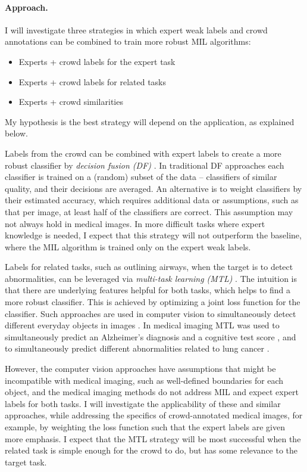 \documentclass[serif, twocolumn, numeric, rga]{jote-article}
\begin{document}
\paragraph{Approach.}

I will investigate three strategies in which expert weak labels and crowd annotations can be combined to train more robust MIL algorithms: 
\begin{itemize}
\item   Experts + crowd labels for the expert task 
\item   Experts + crowd labels for related tasks 
\item   Experts + crowd similarities 
\end{itemize}

My hypothesis is the best strategy will depend on the application, as explained below.

Labels from the crowd can be combined with expert labels to create a more robust classifier by \emph{decision fusion (DF)} \cite{Kittler1998, Kuncheva2004}. In traditional DF approaches each classifier is trained on a (random) subset of the data \cite{Breiman1996a, Ho1998, Dietterich2000} -- classifiers of similar quality, and their decisions are averaged. An alternative is to weight classifiers by their estimated accuracy, which requires additional data or assumptions, such as that per image, at least half of the classifiers are correct.
This assumption may not always hold in medical images. In more difficult tasks where expert knowledge is needed, I expect that this strategy will not outperform the baseline, where the MIL algorithm is trained only on the expert weak labels.

Labels for related tasks, such as outlining airways, when the target is to detect abnormalities, can be leveraged via \emph{multi-task learning (MTL)} \cite{Caruana1998a}. The intuition is that there are underlying features helpful for both tasks, which helps to find a more robust classifier.
This is achieved by optimizing a joint loss function for the classifier.
Such approaches are used in computer vision to simultaneously detect different everyday objects in images \cite{Vezhnevets2010a}. In medical imaging MTL was used to simultaneously predict an Alzheimer's diagnosis and a cognitive test score \cite{Cheng2015}, and to simultaneously predict different abnormalities related to lung cancer \cite{Bi2008a}.

However, the computer vision approaches have assumptions that might be incompatible with medical imaging, such as well-defined boundaries for each object, and the medical imaging methods do not address MIL and expect expert labels for both tasks. I will investigate the applicability of these and similar approaches, while addressing the specifics of crowd-annotated medical images, for example, by weighting the loss function such that the expert labels are given more emphasis. I expect that the MTL strategy will be most successful when the related task is simple enough for the crowd to do, but has some relevance to the target task.
\end{document}
